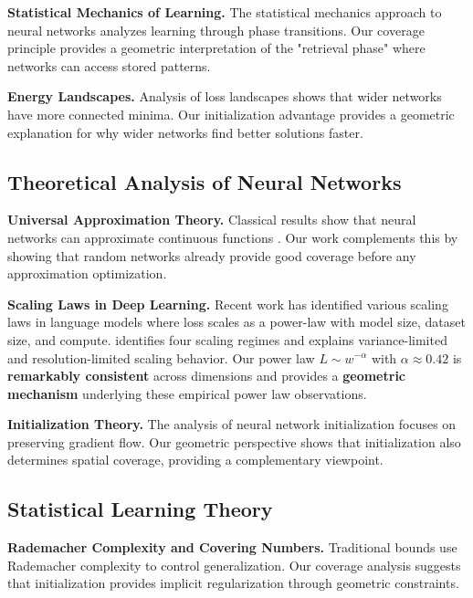 \textbf{Statistical Mechanics of Learning.} The statistical mechanics approach to neural networks \cite{Engel2001StatisticalMO} analyzes learning through phase transitions. Our coverage principle provides a geometric interpretation of the "retrieval phase" where networks can access stored patterns.

\textbf{Energy Landscapes.} Analysis of loss landscapes \cite{Fort2020DeepLV} shows that wider networks have more connected minima. Our initialization advantage provides a geometric explanation for why wider networks find better solutions faster.

\subsection{Theoretical Analysis of Neural Networks}

\textbf{Universal Approximation Theory.} Classical results show that neural networks can approximate continuous functions \cite{Hornik1989MultilayerFN}. Our work complements this by showing that random networks already provide good coverage before any approximation optimization.

\textbf{Scaling Laws in Deep Learning.} Recent work has identified various scaling laws in language models \cite{Kaplan2020ScalingLF} where loss scales as a power-law with model size, dataset size, and compute. \cite{Bahri2024ExplainingNeural} identifies four scaling regimes and explains variance-limited and resolution-limited scaling behavior. Our power law $L \sim w^{-\alpha}$ with $\alpha \approx 0.42$ is \textbf{remarkably consistent} across dimensions and provides a \textbf{geometric mechanism} underlying these empirical power law observations.

\textbf{Initialization Theory.} The analysis of neural network initialization \cite{Glorot2010UnderstandingTD, He2015DelvingDI} focuses on preserving gradient flow. Our geometric perspective shows that initialization also determines spatial coverage, providing a complementary viewpoint.

\subsection{Statistical Learning Theory}

\textbf{Rademacher Complexity and Covering Numbers.} Traditional bounds use Rademacher complexity to control generalization. Our coverage analysis suggests that initialization provides implicit regularization through geometric constraints.

